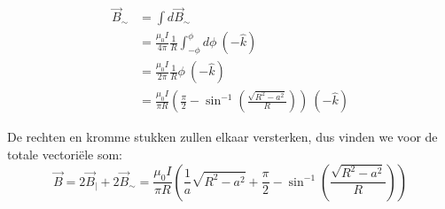 \begin{description}[labelwidth=1.5cm, leftmargin=!]
\begin{itemize}
            \begin{align*}
                \Vec{B}_{\sim} 
                    &= \int d\Vec{B}_{\sim} \\
                    &= \frac{\mu_0I}{4\pi}\frac{1}{R} \int_{-\phi}^{\phi} d\phi \ (-\hat{k}) \\
                    &= \frac{\mu_0I}{2\pi}\frac{1}{R} \phi \ (-\hat{k}) \\
                    &= \frac{\mu_0I}{\pi R}\left(\frac{\pi}{2}-\sin^{-1}\left(\frac{\sqrt{R^2-a^2}}{R}\right)\right) \ (-\hat{k}) 
            \end{align*}
    \end{itemize}
    De rechten en kromme stukken zullen elkaar versterken, dus vinden we voor de totale vectoriële som:
    \begin{equation*}
        \Vec{B} = 2\vec{B}_{|} + 2\Vec{B}_{\sim} = \frac{\mu_0I}{\pi R}\left(\frac{1}{a}\sqrt{R^2-a^2} + \frac{\pi}{2} -\sin^{-1}\left(\frac{\sqrt{R^2-a^2}}{R}\right) \right)
    \end{equation*}
    
\end{description}

\vspace{1cm}